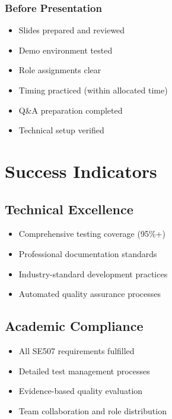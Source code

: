 \documentclass[12pt,a4paper]{article}
\begin{document}
\subsubsection{Before Presentation}
\begin{itemize}[leftmargin=*]
    \item[$\square$] Slides prepared and reviewed
    \item[$\square$] Demo environment tested
    \item[$\square$] Role assignments clear
    \item[$\square$] Timing practiced (within allocated time)
    \item[$\square$] Q\&A preparation completed
    \item[$\square$] Technical setup verified
\end{itemize}

\section{Success Indicators}

\subsection{Technical Excellence}
\begin{itemize}[leftmargin=*]
    \item[$\checkmark$] Comprehensive testing coverage (95\%+)
    \item[$\checkmark$] Professional documentation standards
    \item[$\checkmark$] Industry-standard development practices
    \item[$\checkmark$] Automated quality assurance processes
\end{itemize}

\subsection{Academic Compliance}
\begin{itemize}[leftmargin=*]
    \item[$\checkmark$] All SE507 requirements fulfilled
    \item[$\checkmark$] Detailed test management processes
    \item[$\checkmark$] Evidence-based quality evaluation
    \item[$\checkmark$] Team collaboration and role distribution
\end{itemize}
\end{document}
